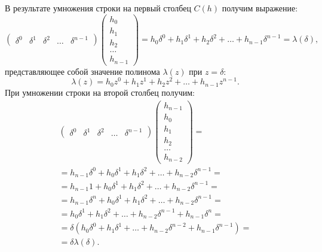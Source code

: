 В результате умножения строки на первый столбец $C(h)$ получим выражение:
\[
    \begin{pmatrix}
        \delta^0 & \delta^1 & \delta^2 & \dots & \delta^{n-1}
    \end{pmatrix}
    \begin{pmatrix}
        h_0   \\
        h_1   \\
        h_2   \\
        \dots \\
        h_{n-1}
    \end{pmatrix}
    =
    h_0 \delta^0 + h_1 \delta^1 + h_2 \delta^2 + \dots + h_{n-1} \delta^{n-1} = \lambda(\delta) ,
\]
представляющее собой значение полинома $\lambda(z)$ при $z = \delta$:
\[
    \lambda(z) = h_0 z^0 + h_1 z^1 + h_2 z^2 + \dots + h_{n-1} z^{n-1} .
\]
При умножении строки на второй столбец получим:
\begin{multline*}
    \begin{pmatrix}
        \delta^0 & \delta^1 & \delta^2 & \dots & \delta^{n-1}
    \end{pmatrix}
    \begin{pmatrix}
        h_{n-1} \\
        h_0     \\
        h_1     \\
        h_2     \\
        \dots   \\
        h_{n-2}
    \end{pmatrix} = \\
    = h_{n-1} \delta^0 + h_0 \delta^1 + h_1 \delta^2 + \dots + h_{n-2} \delta^{n-1} = \\
    = h_{n-1} 1 + h_0 \delta^1 + h_1 \delta^2 + \dots + h_{n-2} \delta^{n-1} = \\
    = h_{n-1} \delta^n + h_0 \delta^1 + h_1 \delta^2 + \dots + h_{n-2} \delta^{n-1} = \\
    = h_0 \delta^1 + h_1 \delta^2 + \dots + h_{n-2} \delta^{n-1} + h_{n-1} \delta^n = \\
    = \delta \left( h_0 \delta^0 + h_1 \delta^1 + \dots + h_{n-2} \delta^{n-2} + h_{n-1} \delta^{n-1} \right) = \\
    = \delta \lambda(\delta) .
\end{multline*}

